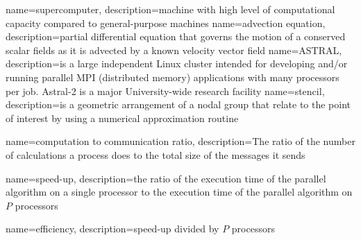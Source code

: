 
{
	name={supercomputer},
	description={machine with high level of computational capacity compared to general-purpose machines}
}
{
	name={advection equation},
	description={partial differential equation that governs the motion of a conserved scalar fields as it is advected by a known velocity vector field \cite{bib:advection}}
}
{
	name={ASTRAL},
	description={is a large independent Linux cluster intended for developing and/or running parallel \gls{MPI} (distributed memory) applications with many processors per job. Astral-2 is a major University-wide research facility \cite{bib:astral}}
}
{
	name={stencil},
	description={is a geometric arrangement of a nodal group that relate to the point of interest by using a numerical approximation routine \cite{bib:stencil}}
}

{
	name={computation to communication ratio},
	description={The ratio of the number of calculations a process does to the total size of the messages it sends \cite{bib:hpc-glossary}}
}

{
	name={speed-up},
	description={the ratio of the execution time of the parallel algorithm on a single processor to the execution time of the parallel algorithm on $P$ processors \cite{bib:lectures-hpc}}
}

{
	name={efficiency},
	description={\gls{speed-up} divided by $P$ processors \cite{bib:lectures-hpc}}
}
